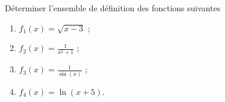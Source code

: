 
\begin{exercice}\label{exostarterST-0003}

Déterminer l'ensemble de définition des fonctions suivantes 
\begin{enumerate}
\item $f_1(x) = \sqrt{x-3}$ ; 
\item $f_2(x) = \frac{1}{x^2+1}$ ; 
\item $f_3(x) = \frac{1}{\sin(x)}$ ;
\item $f_4(x) = \ln(x+5)$.  
\end{enumerate}
  

\end{exercice}
